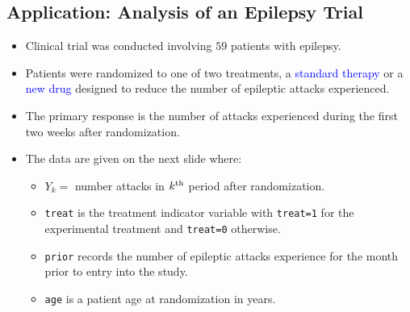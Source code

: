 \documentclass[oneside]{book}\usepackage[]{graphicx}\usepackage[svgnames]{xcolor}
\begin{document}
\subsection*{Application: Analysis of an Epilepsy Trial}
\begin{itemize}
      \item Clinical trial was conducted involving $59$ patients with epilepsy.
      \item Patients were randomized to one of two treatments, a \textcolor{Blue}{standard therapy} or a \textcolor{Blue}{new drug}
            designed to reduce the number of epileptic attacks experienced.
      \item The primary response is the number of attacks experienced during the first two
            weeks after randomization.
      \item The data are given on the next slide where:
            \begin{itemize}
                  \item $ Y_k= $ number attacks in $ k\textsuperscript{th} $ period after randomization.
                  \item \texttt{treat} is the treatment indicator variable with \texttt{treat=1} for the experimental treatment
                        and \texttt{treat=0} otherwise.
                  \item \texttt{prior} records the number of epileptic attacks experience for the month prior to entry into the study.
                  \item \texttt{age} is a patient age at randomization in years.
            \end{itemize}
\end{itemize}
\end{document}
